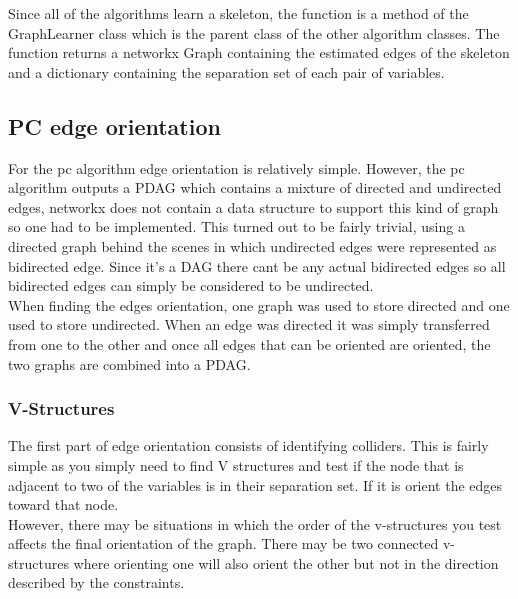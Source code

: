 \documentclass{article}
\begin{document}
Since all of the algorithms learn a skeleton, the function is a method of the GraphLearner class which is the parent class of the other algorithm classes. The function returns a networkx Graph containing the estimated edges of the skeleton and a dictionary containing the separation set of each pair of variables.\\

\subsection{PC edge orientation}
For the pc algorithm edge orientation is relatively simple. However, the pc algorithm outputs a PDAG which contains a mixture of directed and undirected edges, networkx does not contain a data structure to support this kind of graph so one had to be implemented. This turned out to be fairly trivial, using a directed graph behind the scenes in which undirected edges were represented as bidirected edge. Since it's a DAG there cant be any actual bidirected edges so all bidirected edges can simply be considered to be undirected.\\

When finding the edges orientation, one graph was used to store directed and one used to store undirected. When an edge was directed it was simply transferred from one to the other and once all edges that can be oriented are oriented, the two graphs are combined into a PDAG.\\

\subsubsection{V-Structures}
The first part of edge orientation consists of identifying colliders. This is fairly simple as you simply need to find V structures and test if the node that is adjacent to two of the variables is in their separation set. If it is orient the edges toward that node.\\

However, there may be situations in which the order of the v-structures you test affects the final orientation of the graph. There may be two connected v-structures where orienting one will also orient the other but not in the direction described by the constraints.\\

\begin{center}
\end{center}
\end{document}
